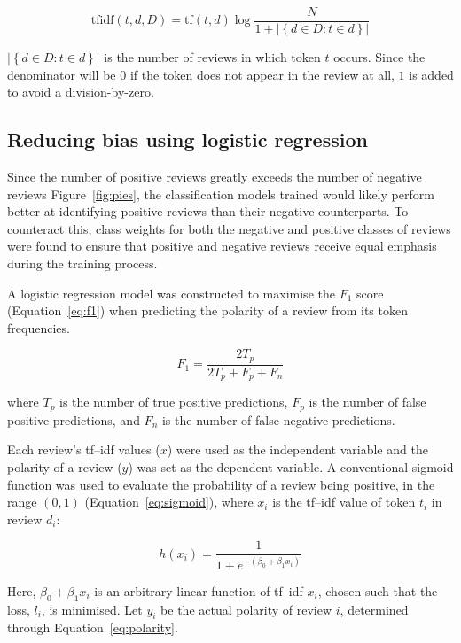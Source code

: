 \documentclass[11pt, a4paper]{pancake-article}
\begin{document}
\begin{equation}
	\text{tfidf}\left(t, d, D\right) = \text{tf}\left(t, d\right)\log\frac{N}{1 + \left|\left\{d \in D : t\in d\right\}\right|}
	\label{eq:tf-idf}
\end{equation}

\(\left|\left\{d \in D : t \in d\right\}\right|\) is the number of reviews in which token \(t\) occurs.
Since the denominator will be \(0\) if the token does not appear in the review at all, \(1\) is added
to avoid a division-by-zero.

\subsection{Reducing bias using logistic regression}

Since the number of positive reviews greatly exceeds the number of negative reviews Figure~\ref{fig:pies},
the classification models trained would likely perform better at identifying positive reviews than their
negative counterparts. To counteract this, class weights for both the negative and positive classes of reviews
were found to ensure that positive and negative reviews receive equal emphasis during the training process.

A logistic regression model was constructed to maximise the $F_1$ score (Equation~\ref{eq:f1}) when
predicting the polarity of a review from its token frequencies.

\begin{equation}
	F_1 = \frac{2 T_p}{2 T_p + F_p + F_n}
	\label{eq:f1}
\end{equation}

where $T_p$ is the number of true positive predictions, $F_p$ is the number of false positive predictions,
and $F_n$ is the number of false negative predictions.

Each review's tf--idf values ($x$) were used as the independent variable and the polarity of a review ($y$) was set
as the dependent variable. A conventional sigmoid function was used to evaluate the probability of a review being positive, in the range
\(\left(0, 1\right)\) (Equation~\ref{eq:sigmoid}), where \(x_i\) is the tf--idf value of token \(t_i\) in
review \(d_i\):

\begin{equation}
	h\left(x_i\right)	= \frac{1}{1 + e^{-\left(\beta_0 + \beta_1 x_i\right)}}
	\label{eq:sigmoid}
\end{equation}

Here, \(\beta_0 + \beta_1 x_i\) is an arbitrary linear function of tf--idf \(x_i\), chosen
such that the loss, \(l_i\), is minimised. Let \(y_i\) be the actual polarity of review \(i\),
determined through Equation~\ref{eq:polarity}.
\end{document}
